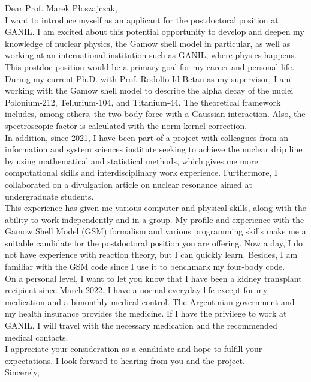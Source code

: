 \subject{Application as postdoctoral fellowship in theoretical nuclear physics at GANIL}
\coverletter[sender=false, vspace=4mm]

Dear Prof. Marek Płoszajczak,\\

I want to introduce myself as an applicant for the postdoctoral position at GANIL. I am excited about this potential opportunity to develop and deepen my knowledge of nuclear physics, the Gamow shell model in particular, as well
as working at an international institution such as GANIL, where physics happens. This postdoc position would be a primary goal for my career and personal life. \\

During my current Ph.D. with Prof. Rodolfo Id Betan as my supervisor, I am working with the Gamow shell model to describe the alpha decay of the nuclei Polonium-212, Tellurium-104, and Titanium-44. The theoretical framework includes, among others, the two-body force with a Gaussian interaction. Also, the spectroscopic factor is calculated with the norm kernel correction. \\

In addition, since 2021, I have been part of a project with colleagues from an information and system sciences institute seeking to achieve the nuclear drip line by using mathematical and statistical methods, which gives me more computational skills and interdisciplinary work experience. Furthermore, I collaborated on a divulgation article on nuclear resonance aimed at undergraduate students. \\

This experience has given me various computer and physical skills, along with the ability to work independently and in a group. My profile and experience with the Gamow Shell Model (GSM) formalism and various programming skills make me a suitable candidate for the postdoctoral position you are offering.
Now a day, I do not have experience with reaction theory, but I can quickly learn. Besides, I am familiar with the GSM code since I use it to benchmark my four-body code. \\

On a personal level, I want to let you know that I have been a kidney transplant recipient since March 2022. I have a normal everyday life except for my medication and a bimonthly medical control. The Argentinian government and my health insurance provides the medicine. If I have the privilege to work at GANIL, I will travel with the necessary medication and the recommended medical contacts. \\

I appreciate your consideration as a candidate and hope to fulfill your expectations. I look forward to hearing from you and the project. \\

Sincerely, 
